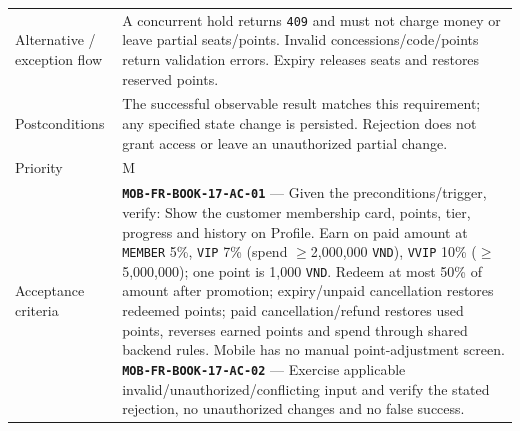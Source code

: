 \begin{longtable}{@{}P{0.23000\SRSWidth}P{0.77000\SRSWidth}@{}}
Alternative /\allowbreak{} exception flow & A concurrent hold returns \texttt{409} and must not charge money or leave partial seats/\allowbreak{}points. Invalid concessions/\allowbreak{}code/\allowbreak{}points return validation errors. Expiry releases seats and restores reserved points. \\[3pt]
Postconditions & The successful observable result matches this requirement; any specified state change is persisted. Rejection does not grant access or leave an unauthorized partial change. \\[3pt]
Priority & M \\[3pt]
Acceptance criteria & \textbf{\texttt{MOB-\allowbreak{}FR-\allowbreak{}BOOK-\allowbreak{}17-\allowbreak{}AC-\allowbreak{}01}} — Given the preconditions/\allowbreak{}trigger, verify: Show the customer membership card, points, tier, progress and history on Profile. Earn on paid amount at \texttt{MEMBER} 5\%, \texttt{VIP} 7\% (spend \ensuremath{\geq}2,000,000 \texttt{VND}), \texttt{VVIP} 10\% (\ensuremath{\geq}5,000,000); one point is 1,000 \texttt{VND}. Redeem at most 50\% of amount after promotion; expiry/\allowbreak{}unpaid cancellation restores redeemed points; paid cancellation/\allowbreak{}refund restores used points, reverses earned points and spend through shared backend rules. Mobile has no manual point-adjustment screen. \textbf{\texttt{MOB-\allowbreak{}FR-\allowbreak{}BOOK-\allowbreak{}17-\allowbreak{}AC-\allowbreak{}02}} — Exercise applicable invalid/\allowbreak{}unauthorized/\allowbreak{}conflicting input and verify the stated rejection, no unauthorized changes and no false success. \\[3pt]

\end{longtable}
